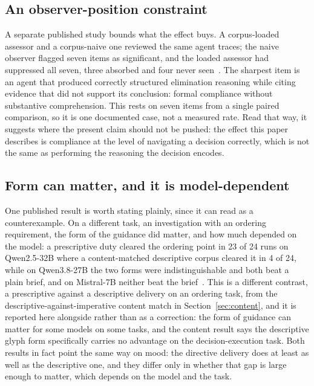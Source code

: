 \documentclass[11pt,a4paper]{article}
\begin{document}
\subsection{An observer-position constraint}\label{sec:observer}

A separate published study bounds what the effect buys. A corpus-loaded assessor and a
corpus-naive one reviewed the same agent traces; the naive observer flagged seven items
as significant, and the loaded assessor had suppressed all seven, three absorbed and
four never seen~\citep{neilson2026canon}. The sharpest item is an agent that produced
correctly structured elimination reasoning while citing evidence that did not support
its conclusion: formal compliance without substantive comprehension. This rests on seven
items from a single paired comparison, so it is one documented case, not a measured rate.
Read that way, it suggests where the present claim should not be pushed: the effect this
paper describes is compliance at the level of navigating a decision correctly, which is
not the same as performing the reasoning the decision encodes.

\subsection{Form can matter, and it is model-dependent}\label{sec:form}

One published result is worth stating plainly, since it can read as a counterexample. On a
different task, an investigation with an ordering requirement, the form of the guidance
did matter, and how much depended on the model: a prescriptive duty cleared the ordering
point in 23 of 24 runs on Qwen2.5-32B where a content-matched descriptive corpus cleared
it in 4 of 24, while on Qwen3.8-27B the two forms were indistinguishable and both beat a
plain brief, and on Mistral-7B neither beat the brief~\citep{neilson2026duty}. This is a
different contrast, a prescriptive against a descriptive delivery on an ordering task,
from the descriptive-against-imperative content match in Section~\ref{sec:content}, and
it is reported here alongside rather than as a correction: the form of guidance can
matter for some models on some tasks, and the content result says the descriptive glyph
form specifically carries no advantage on the decision-execution task. Both results in
fact point the same way on mood: the directive delivery does at least as well as the
descriptive one, and they differ only in whether that gap is large enough to matter,
which depends on the model and the task.
\end{document}
